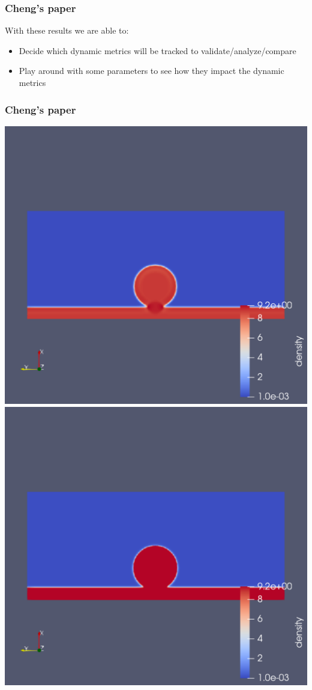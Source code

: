 \documentclass{beamer}
\begin{document}
	\begin{frame}
		\frametitle{Cheng's paper}
		With these results we are able to:
		\begin{itemize}
			\item Decide which dynamic \alert{metrics} will be tracked to validate/analyze/compare
			\item Play around with some parameters to see how they impact the dynamic metrics
		\end{itemize}
	\end{frame}

	\begin{frame}
		\frametitle{Cheng's paper}
		
		\includegraphics[scale=0.2]{pics/impactingDroplet.pdf}
		\includegraphics[scale=0.2]{pics/impactingDropletMCMP.pdf}\\

\end{frame}
\end{document}
